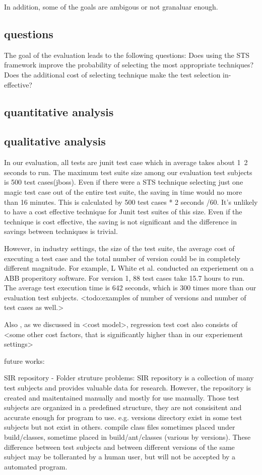 In addition, some of the goals are ambigous or not granaluar enough. 
\subsection{questions}
The goal of the evaluation leads to the following questions:
Does using the STS framework improve the probability of selecting the most
appropriate techniques? 
Does the additional cost of selecting technique make the test selection
in-effective?

\subsection{quantitative analysis}

\subsection{qualitative analysis}
In our evaluation, all tests are junit test case which in average takes about
1~2 seconds to run. The maximum test suite size among our evaluation test
subjects is 500 test cases(jboss). Even if there were a STS technique selecting
just one magic test case out of the entire test suite, the saving in time would
no more than 16 minutes. This is calculated by 500 test cases * 2 seconds /60.
It's unlikely to have a cost effective technique for Junit test suites of this
size. Even if the technique is cost effective, the saving is not significant
and the difference in savings between techniques is trivial.

However, in industry settings, the size of the test suite, the average cost of
executing a test case and the total number of version could be in completely
different magnitude. For example, L White et al. conducted an experiement on a
ABB properitory software.\cite{DBLP:journals/smr/WhiteJRR08} For version 1, 88
test cases take 15.7 hours to run. The average test execution time is 642
seconds, which is 300 times more than our evaluation test subjects.
<todo:examples of number of versions and number of test cases as well.> 


Also , as we discussed in <cost model>, regression test cost also consists of
<some other cost factors, that is significantly higher than in our experiement
settings>



future works:

SIR repository - 
Folder struture problems:
SIR repository is a collection of many test subjects and provides
valuable data for research. However, the repository is created and maitentained
manually and mostly for use manually. Those test subjects are organized in a
predefined structure, they are not consisitent and accurate enough for program
to use.  e.g. versions directory exist in some test subjects but not exist in
others. compile class files sometimes placed under build/classes, sometime
placed in build/ant/classes (various by versions). These difference between test
subjects and between different versions of the same subject may be tolleranted
by a human user, but will not be accepted by a automated program. 

